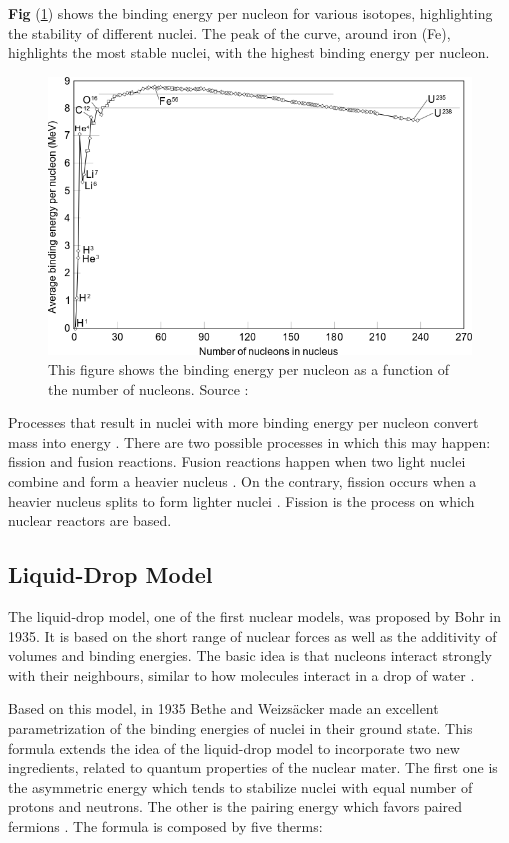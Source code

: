 \textbf{Fig} (\ref{fig:BE_energy_per_nucleon}) shows the binding energy per nucleon for various isotopes, highlighting the stability of different nuclei. The peak of the curve, around iron (Fe), highlights the most stable nuclei, with the highest binding energy per nucleon.

\begin{figure}[h]
    \centering
    \includegraphics[width=0.75\linewidth]{Kap2/Figures/Binding_energy_curve_-_common_isotopes.png}
    \caption{This figure shows the binding energy per nucleon as a function of the number of nucleons. Source : \cite{BEPN_figure}}
    \label{fig:BE_energy_per_nucleon}
\end{figure}

Processes that result in nuclei with more binding energy per nucleon convert mass into energy \cite{Stacey_2010}. There are two possible processes in which this may happen: fission and fusion reactions. Fusion reactions happen when two light nuclei combine and form a heavier nucleus \cite{Lewis_2014}. On the contrary, fission occurs when a heavier nucleus splits to form lighter nuclei \cite{Stacey_2010}. Fission is the process on which nuclear reactors are based.

\subsection{Liquid-Drop Model}
The liquid-drop model, one of the first nuclear models, was proposed by Bohr in 1935. It is based on the short range of nuclear forces as well as the additivity of volumes and binding energies. The basic idea is that nucleons interact strongly with their neighbours, similar to how molecules interact in a drop of water \cite{Spiro}.

Based on this model, in 1935 Bethe and Weizs\"{a}cker made an excellent parametrization of the binding energies of nuclei in their ground state. This formula extends the idea of the liquid-drop model to incorporate two new ingredients, related to quantum properties of the nuclear mater. The first one is the asymmetric energy which tends to stabilize nuclei with equal number of protons and neutrons. The other is the pairing energy which favors paired fermions \cite{Spiro}. The formula is composed by five therms:

